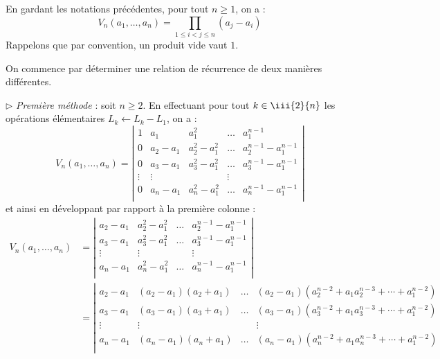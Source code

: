 \documentclass[french,11pt,twoside]{VcCours}
\begin{document}
\begin{Proposition}{} En gardant les notations précédentes, pour tout $n \geq 1$, on a :
$$ V_n(a_1, \ldots, a_n) = \prod_{1 \leq i<j \leq n} (a_j-a_i) $$
Rappelons que par convention, un produit vide vaut $1$.
\end{Proposition}

\begin{Demonstration}{} On commence par déterminer une relation de récurrence de deux manières différentes. 

\medskip

$\rhd$ \emph{Première méthode} : soit $n \geq 2$. En effectuant pour tout $k \in \iii{2}{n}$ les opérations élémentaires $L_k \leftarrow L_k-L_1$, on a :
$$ V_n(a_1, \ldots, a_n) = \left\vert \begin{array}{ccccc}
1 & a_1 & a_1^2  & \ldots & a_1^{n-1} \\
0 & a_2-a_1 & a_2^2 - a_1^2 & \ldots & a_2^{n-1} - a_1^{n-1} \\
0 & a_3 -a_1& a_3^2-a_1^2 & \ldots & a_3^{n-1}- a_1^{n-1} \\
\vdots & \vdots & & \vdots \\
0 & a_n-a_1 & a_n^2 - a_1^2 & \ldots & a_n^{n-1} - a_1^{n-1}\\
\end{array}\right\vert$$
et ainsi en développant par rapport à la première colonne :
\begin{align*}
V_n(a_1, \ldots, a_n) & = \left\vert \begin{array}{cccc}
a_2-a_1 & a_2^2 - a_1^2 & \ldots & a_2^{n-1} - a_1^{n-1} \\
a_3 -a_1& a_3^2-a_1^2 & \ldots & a_3^{n-1}- a_1^{n-1} \\
\vdots &  \vdots & & \vdots \\
a_n-a_1 & a_n^2 - a_1^2 & \ldots & a_n^{n-1} - a_1^{n-1}\\
\end{array}\right\vert \\
& = \left\vert\begin{array}{cccc}
a_2-a_1 & (a_2-a_1)(a_2+a_1)& \ldots & (a_2-a_1)(a_2^{n-2} + a_1 a_2^{n-3} + \cdots + a_1^{n-2}) \\
a_3 -a_1& (a_3-a_1)(a_3+a_1) & \ldots & (a_3-a_1)(a_3^{n-2} + a_1 a_3^{n-3} + \cdots + a_1^{n-2}) \\
\vdots &  \vdots & & \vdots \\
a_n-a_1 & (a_n - a_1)(a_n+a_1) & \ldots & (a_n-a_1)(a_n^{n-2} + a_1 a_n^{n-3} + \cdots + a_1^{n-2}) \\

\end{array}
\end{align*}
\end{Demonstration}
\end{document}
